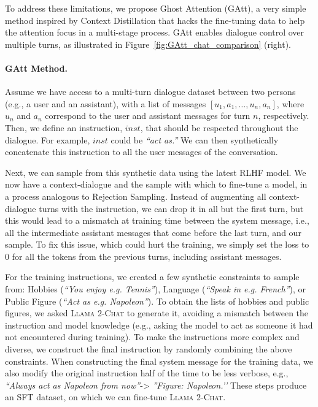 \documentclass{article}
\newcommand{\modelname}{\textsc{Llama 2-Chat}\xspace}
\begin{document}
To address these limitations, we propose 
 Ghost Attention (GAtt), a very simple method inspired by Context Distillation \citep{bai2022constitutional} that hacks the fine-tuning data to help the attention focus in a multi-stage process. GAtt enables dialogue control over multiple turns, as illustrated in Figure~\ref{fig:GAtt_chat_comparison} (right). 


\paragraph{GAtt Method.}
Assume we have access to a multi-turn dialogue dataset between two persons (e.g., a user and an assistant), with a list of messages $[u_1, a_1, \ldots, u_n, a_n]$, where $u_n$ and $a_n$ correspond to the user and assistant messages for turn $n$, respectively. Then, we define an instruction, $inst$, that should be respected throughout the dialogue. For example, $inst$ could be \textit{``act as.''} We can then synthetically concatenate this instruction to all the user messages of the conversation.

Next, we can sample from this synthetic data using the latest RLHF model. We now have a context-dialogue and the sample with which to fine-tune a model, in a process analogous to Rejection Sampling. Instead of augmenting all context-dialogue turns with the instruction, we can drop it in all but the first turn, but this would lead to a mismatch at training time between the system message, i.e., all the intermediate assistant messages that come before the last turn, and our sample. To fix this issue, which could hurt the training, we simply set the loss to 0 for all the tokens from the previous turns, including assistant messages.

For the training instructions, we created a few synthetic constraints to sample from: Hobbies (\textit{``You enjoy e.g. Tennis''}),  Language (\textit{``Speak in e.g. French''}), or Public Figure (\textit{``Act as e.g. Napoleon''}). To obtain the lists of hobbies and public figures, we asked \modelname to generate it, avoiding a mismatch between the instruction and model knowledge (e.g., asking the model to act as someone it had not encountered during training).
To make the instructions more complex and diverse, we construct the final instruction by randomly combining the above constraints.
When constructing the final system message for the training data, we also modify the original instruction half of the time to be less verbose, e.g., \textit{``Always act as Napoleon from now''}-> \textit{''Figure: Napoleon.’’}
These steps produce an SFT dataset, on which we can fine-tune \modelname. 
\end{document}

